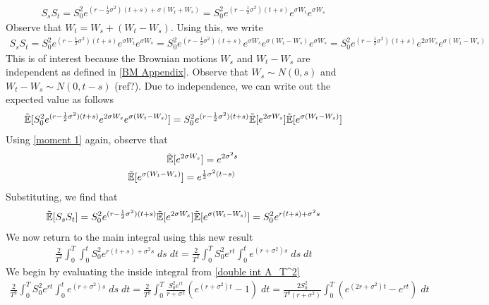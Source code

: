 \documentclass[reqno]{amsart}
\newcommand{\rE}[1]{\tilde{\E}[#1]}
\begin{document}
\begin{align}
     S_{s} S_{t} 
     = S_0^2 e^{(r-\frac{1}{2}\sigma^2)(t+s)+\sigma(W_t+W_s)}
     = S_0^2 e^{(r-\frac{1}{2}\sigma^2)(t+s)} e^{\sigma W_t} e^{\sigma W_s}
\end{align}
Observe that $W_t = W_s + (W_t - W_s)$. Using this, we write
\begin{align}
     S_{s} S_{t} 
     = S_0^2 e^{(r-\frac{1}{2}\sigma^2)(t+s)} e^{\sigma W_t} e^{\sigma W_s}
     = S_0^2 e^{(r-\frac{1}{2}\sigma^2)(t+s)} e^{\sigma W_s} e^{\sigma (W_t - W_s)} e^{\sigma W_s}
     = S_0^2 e^{(r-\frac{1}{2}\sigma^2)(t+s)} e^{2 \sigma W_s} e^{\sigma (W_t - W_s)}
\end{align}
This is of interest because the Brownian motions $W_s$ and $W_t - W_s$ are independent as defined in \eqref{BM Appendix}.
Observe that $W_s \sim N(0, s)$ and $W_t - W_s \sim N(0, t-s)$ (ref?). Due to independence, we can write out the expected value as follows
\begin{align}
     \rE{S_0^2 e^{(r-\frac{1}{2}\sigma^2)(t+s)}e^{2 \sigma W_s} e^{\sigma (W_t - W_s)}}
     = S_0^2 e^{(r-\frac{1}{2}\sigma^2)(t+s)} \rE{e^{2 \sigma W_s}} \rE{e^{\sigma (W_t - W_s)}}
\end{align}
Using \eqref{moment 1} again, observe that
\begin{align}
     \rE{e^{2 \sigma W_s}} = e^{2 \sigma^2 s} \\
     \rE{e^{\sigma (W_t - W_s)}} = e^{\frac{1}{2} \sigma^2 (t-s)} \;
\end{align}
Substituting, we find that
\begin{align}
     \rE{S_{s} S_{t}} 
     = S_0^2 e^{(r-\frac{1}{2}\sigma^2)(t+s)} \rE{e^{2 \sigma W_s}} \rE{e^{\sigma (W_t - W_s)}}
     = S_0^2 e^{r(t+s)+\sigma^2s}
\end{align}
We now return to the main integral using this new result
\begin{align} \label{double int A_T^2}
     \frac{2}{T^2} \int_0^T \int_0^t S_0^2 e^{r(t+s)+\sigma^2s} \; ds \; dt = \frac{2}{T^2} \int_0^T S_0^2 e^{rt} \int_0^t e^{(r + \sigma^2)s} \; ds \; dt
\end{align}
We begin by evaluating the inside integral from \eqref{double int A_T^2}
\begin{align}
     \frac{2}{T^2} \int_0^T S_0^2 e^{rt} \int_0^t e^{(r + \sigma^2)s} \; ds \; dt = \frac{2}{T^2} \int_0^T \frac{S_0^2 e^{rt}}{r + \sigma^2} (e^{(r+\sigma^2)t} - 1) \; dt = \frac{2 S_0^2}{T^2(r + \sigma^2)} \int_0^T  (e^{(2r+\sigma^2)t} - e^{rt}) \; dt
\end{align}
\end{document}
